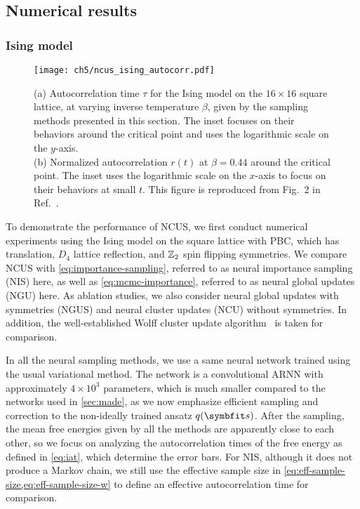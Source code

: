 \subsection{Numerical results}

\subsubsection{Ising model}

\begin{figure}[htb]
\centering
\texttt{[image: ch5/ncus\_ising\_autocorr.pdf]}
\caption[NCUS results of Ising model]{
(a) Autocorrelation time $\tau$ for the Ising model on the $16 \times 16$ square lattice, at varying inverse temperature $\beta$, given by the sampling methods presented in this section.
The inset focuses on their behaviors around the critical point and uses the logarithmic scale on the $y$-axis. \\
(b) Normalized autocorrelation $r(t)$ at $\beta = 0.44$ around the critical point.
The inset uses the logarithmic scale on the $x$-axis to focus on their behaviors at small $t$.
This figure is reproduced from Fig.~2 in Ref.~\cite{wu2021unbiased}.
}
\label{fig:ncus-ising-autocorr}
\end{figure}

To demonstrate the performance of NCUS, we first conduct numerical experiments using the Ising model on the square lattice with PBC, which has translation, $D_4$ lattice reflection, and $\mathbb{Z}_2$ spin flipping symmetries. We compare NCUS with \cref{eq:importance-sampling}, referred to as neural importance sampling (NIS) here, as well as \cref{eq:mcmc-importance}, referred to as neural global updates (NGU) here. As ablation studies, we also consider neural global updates with symmetries (NGUS) and neural cluster updates (NCU) without symmetries. In addition, the well-established Wolff cluster update algorithm~\cite{wolff1989collective} is taken for comparison.

In all the neural sampling methods, we use a same neural network trained using the usual variational method. The network is a convolutional ARNN with approximately $4 \times 10^3$ parameters, which is much smaller compared to the networks used in \cref{sec:made}, as we now emphasize efficient sampling and correction to the non-ideally trained ansatz $q(\vs)$. After the sampling, the mean free energies given by all the methods are apparently close to each other, so we focus on analyzing the autocorrelation times of the free energy as defined in \cref{eq:iat}, which determine the error bars. For NIS, although it does not produce a Markov chain, we still use the effective sample size in \cref{eq:eff-sample-size,eq:eff-sample-size-w} to define an effective autocorrelation time for comparison.

